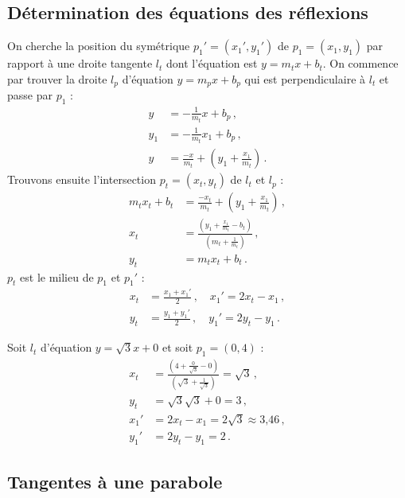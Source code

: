 
\subsection{Détermination des équations des réflexions}
On cherche la position du symétrique  $p_1'=(x_1',y_1')$ de $p_1=(x_1,y_1)$ par rapport à une droite tangente $l_t$ dont l'équation est $y=m_tx+b_t$. On commence par trouver la droite $l_p$ d'équation $y=m_px+b_p$ qui est perpendiculaire à $l_t$ et passe par $p_1$ :
\begin{align*}
y&=-\frac{1}{m_t}x+b_p\,,\\
y_1&=-\frac{1}{m_t}x_1+b_p\,,\\
y&=\frac{-x}{m_t}+\left(y_1+\frac{x_1}{m_t}\right)\,.
\end{align*}
Trouvons ensuite l'intersection $p_t=(x_t,y_t)$ de $l_t$ et $l_p$ :
%
\begin{align*}
m_tx_t+b_t&=\frac{-x_t}{m_t}+\left(y_1+\frac{x_1}{m_t}\right)\,,\\
x_t&=\frac{\left(y_1+\displaystyle\frac{x_1}{m_t}-b_t\right)}{\left(m_t+\displaystyle\frac{1}{m_t}\right)}\,,\\
y_t&=m_tx_t+b_t\,.
\end{align*}
$p_t$ est le milieu de  $p_1$ et $p_1'$ :
\begin{align*}
x_t&=\displaystyle\frac{x_1+x_1'}{2}\,,\quad  x_1'=2x_t-x_1\,,\\
y_t&=\displaystyle\frac{y_1+y_1'}{2}\,,\quad  y_1'=2y_t-y_1\,.
\end{align*}



\begin{example}
Soit $l_t$ d'équation $y=\sqrt{3}x+0$ et soit $p_1=(0,4)$ :
\begin{align*}
x_t&=\frac{\left(4+\displaystyle\frac{0}{\sqrt{3}}-0\right)}{\left(\sqrt{3}+\displaystyle\frac{1}{\sqrt{3}}\right)}=\sqrt{3}\,,\\
y_t&=\sqrt{3}\sqrt{3}+0=3\,,\\
x_1'&=2x_t-x_1=2\sqrt{3}\approx \mbox{3,46}\,,\\
y_1'&=2y_t-y_1= 2\,.
\end{align*}
\end{example}


\subsection{Tangentes à une parabole}\label{s.parabola}

